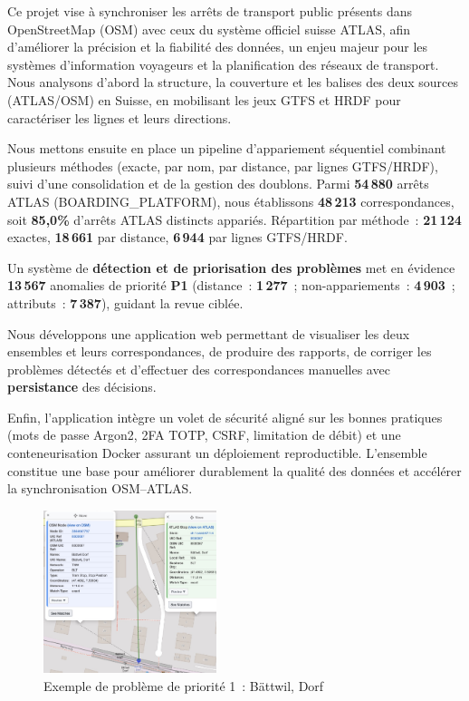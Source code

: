 \begin{spacing}{0.91}
\vspace{-0.55cm}

Ce projet vise à synchroniser les arrêts de transport public présents dans OpenStreetMap (OSM) avec ceux du système officiel suisse ATLAS, afin d’améliorer la précision et la fiabilité des données, un enjeu majeur pour les systèmes d’information voyageurs et la planification des réseaux de transport. Nous analysons d’abord la structure, la couverture et les balises des deux sources (ATLAS/OSM) en Suisse, en mobilisant les jeux GTFS et HRDF pour caractériser les lignes et leurs directions.

Nous mettons ensuite en place un pipeline d’appariement séquentiel combinant plusieurs méthodes (exacte, par nom, par distance, par lignes GTFS/HRDF), suivi d’une consolidation et de la gestion des doublons. Parmi \textbf{54\,880} arrêts ATLAS (BOARDING\_PLATFORM), nous établissons \textbf{48\,213} correspondances, soit \textbf{85,0\%} d’arrêts ATLAS distincts appariés. Répartition par méthode : \textbf{21\,124} exactes, \textbf{18\,661} par distance, \textbf{6\,944} par lignes GTFS/HRDF.

Un système de \textbf{détection et de priorisation des problèmes} met en évidence \textbf{13\,567} anomalies de priorité \textbf{P1} (distance : \textbf{1\,277} ; non-appariements : \textbf{4\,903} ; attributs : \textbf{7\,387}), guidant la revue ciblée.

Nous développons une application web permettant de visualiser les deux ensembles et leurs correspondances, de produire des rapports, de corriger les problèmes détectés et d’effectuer des correspondances manuelles avec \textbf{persistance} des décisions.

Enfin, l'application intègre un volet de sécurité aligné sur les bonnes pratiques (mots de passe Argon2, 2FA TOTP, CSRF, limitation de débit) et une conteneurisation Docker assurant un déploiement reproductible.  L'ensemble constitue une base pour améliorer durablement la qualité des données et accélérer la synchronisation OSM–ATLAS.

\vspace{0.15cm}
\begin{figure}[h]
\centering
\includegraphics[width=0.45\textwidth]{figures/abstract.jpg}
\caption*{Exemple de problème de priorité 1~: Bättwil, Dorf}
\end{figure}
\vspace{0.0cm}


\end{spacing}
